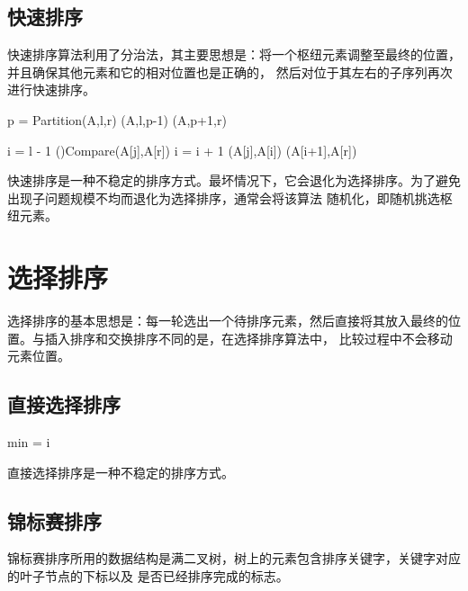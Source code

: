 \subsection{快速排序}
快速排序算法利用了分治法，其主要思想是：将一个枢纽元素调整至最终的位置，并且确保其他元素和它的相对位置也是正确的，
然后对位于其左右的子序列再次进行快速排序。

\begin{algorithm}
    {
        p = Partition(A,l,r)\;
        \Quick(A,l,p-1)\;
        \Quick(A,p+1,r)\;
    }
   \caption{Quick-Sort(A,l,r)} 
\end{algorithm}
\begin{function}[H]
    \;
    \;
    i = l - 1\;
    {
        \If(){Compare(A[j],A[r])}
        {
            i = i + 1\;
            \Swap(A[j],A[i])\;
        }
    }
    \Swap(A[i+1],A[r])\;
    \caption{Partition(A,l,r)}
\end{function}
快速排序是一种不稳定的排序方式。最坏情况下，它会退化为选择排序。为了避免出现子问题规模不均而退化为选择排序，通常会将该算法
随机化，即随机挑选枢纽元素。

\section{选择排序}
选择排序的基本思想是：每一轮选出一个待排序元素，然后直接将其放入最终的位置。与插入排序和交换排序不同的是，在选择排序算法中，
比较过程中不会移动元素位置。
\subsection{直接选择排序}
\begin{algorithm}
    {
        min = i\;
        {
        }
    } 
    \caption{Select-Sort(nums)}
\end{algorithm}
直接选择排序是一种不稳定的排序方式。
\subsection{锦标赛排序}
锦标赛排序所用的数据结构是满二叉树，树上的元素包含排序关键字，关键字对应的叶子节点的下标以及
是否已经排序完成的标志。

